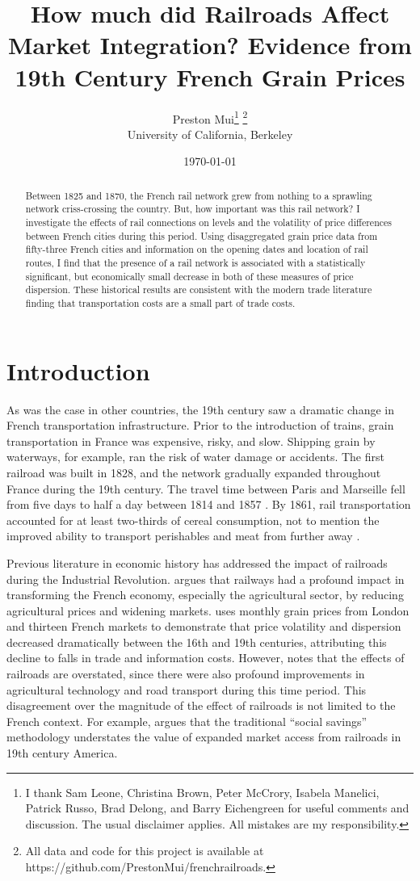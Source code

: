 \documentclass[12pt,twoside]{article}
\title{How much did Railroads Affect Market Integration? Evidence from 19th Century French Grain Prices}
\date{\today}
\author{Preston Mui\thanks{I thank Sam Leone, Christina Brown, Peter McCrory, Isabela Manelici, Patrick Russo, Brad Delong, and Barry Eichengreen for useful comments and discussion. The usual disclaimer applies. All mistakes are my responsibility.} \footnote{All data and code for this project is available at https://github.com/PrestonMui/frenchrailroads.}  \\ University of California, Berkeley}
\begin{document}
\maketitle

\begin{abstract}
   Between 1825 and 1870, the French rail network grew from nothing to a sprawling network criss-crossing the country.
   But, how important was this rail network?
   I investigate the effects of rail connections on levels and the volatility of price differences between French cities during this period.
   Using disaggregated grain price data from fifty-three French cities and information on the opening dates and location of rail routes, I find that the presence of a rail network is associated with a statistically significant, but economically small decrease in both of these measures of price dispersion.
   These historical results are consistent with the modern trade literature finding that transportation costs are a small part of trade costs.
\end{abstract}

\newpage
\section{Introduction}

As was the case in other countries, the 19th century saw a dramatic change in French transportation infrastructure.
Prior to the introduction of trains, grain transportation in France was expensive, risky, and slow.
Shipping grain by waterways, for example, ran the risk of water damage or accidents.
The first railroad was built in 1828, and the network gradually expanded throughout France during the 19th century.
The travel time between Paris and Marseille fell from five days to half a day between 1814 and 1857 \citep{thevenin}.
By 1861, rail transportation accounted for at least two-thirds of cereal consumption, not to mention the improved ability to transport perishables and meat from further away \citep{price}.

Previous literature in economic history has addressed the impact of railroads during the Industrial Revolution.
\cite{price} argues that railways had a profound impact in transforming the French economy, especially the agricultural sector, by reducing agricultural prices and widening markets.
\cite{persson} uses monthly grain prices from London and thirteen French markets to demonstrate that price volatility and dispersion decreased dramatically between the 16th and 19th centuries, attributing this decline to falls in trade and information costs.
However, \cite{ville} notes that the effects of railroads are overstated, since there were also profound improvements in agricultural technology and road transport during this time period.
This disagreement over the magnitude of the effect of railroads is not limited to the French context.
For example, \cite{donaldson} argues that the traditional ``social savings'' methodology understates the value of expanded market access from railroads in 19th century America.
\end{document}
